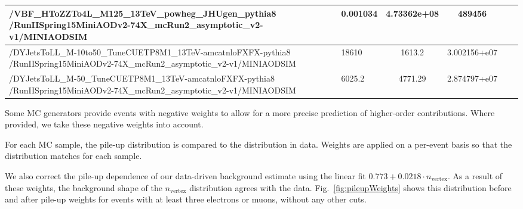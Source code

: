 \begin{table}
\begin{tabular}{p{14cm} l c c c l}
\hline
/VBF\_HToZZTo4L\_M125\_13TeV\_powheg\_JHUgen\_pythia8 \newline /RunIISpring15MiniAODv2-74X\_mcRun2\_asymptotic\_v2-v1/MINIAODSIM	& 0.001034	& 4.73362e+08	& 489456\\
\hline
/DYJetsToLL\_M-10to50\_TuneCUETP8M1\_13TeV-amcatnloFXFX-pythia8 \newline /RunIISpring15MiniAODv2-74X\_mcRun2\_asymptotic\_v2-v1/MINIAODSIM	& 18610	& 1613.2	& 3.002156+e07\\
\hline
/DYJetsToLL\_M-50\_TuneCUETP8M1\_13TeV-amcatnloFXFX-pythia8 \newline /RunIISpring15MiniAODv2-74X\_mcRun2\_asymptotic\_v2-v1/MINIAODSIM	& 6025.2	& 4771.29	& 2.874797+e07\\
\end{tabular}
\end{table}

Some MC generators provide events with negative weights to allow for a more precise prediction of higher-order contributions. Where provided, we take these negative weights into account.

For each MC sample, the pile-up distribution is compared to the distribution in data. Weights are applied on a per-event basis so that the distribution matches for each sample.

We also correct the pile-up dependence of our data-driven background estimate using the linear fit $0.773 + 0.0218 \cdot n_\textrm{vertex}$. As a result of these weights, the background shape of the $n_\textrm{vertex}$ distribution agrees with the data. Fig.~\ref{fig:pileupWeights} shows this distribution before and after pile-up weights for events with at least three electrons or muons, without any other cuts.

